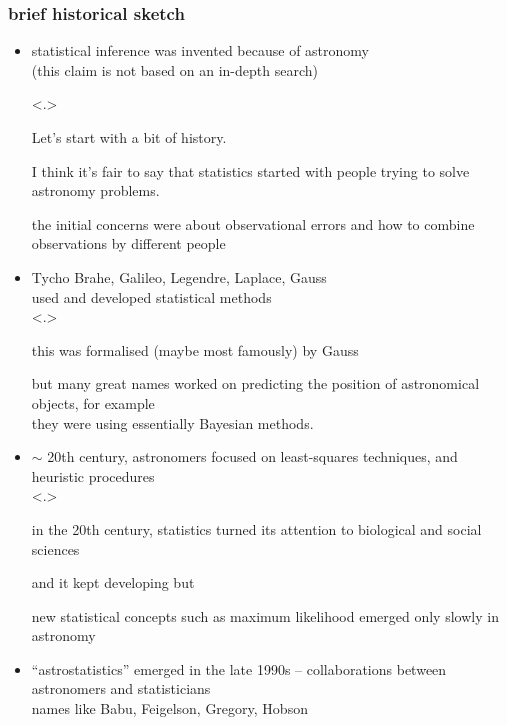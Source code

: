 \documentclass{beamer}              %
\begin{document}
\begin{frame}
  \frametitle{brief historical sketch}

  \begin{itemize}[<+->]
    \item statistical inference was invented because of astronomy\\
      {\footnotesize (this claim is not based on an in-depth search)}

    \note<.>{
            Let's start with a bit of history.

            I think it's fair to say that statistics started with people trying to solve astronomy problems.

            the initial concerns were about observational errors and how to combine observations by different people
            }

    \item Tycho Brahe, Galileo, Legendre, Laplace, Gauss \\used and developed statistical methods\\

    \note<.>{
            this was formalised (maybe most famously) by Gauss

            but many great names worked on predicting the position of astronomical objects, for example\\

            they were using essentially Bayesian methods.
            }

    
    \item $\sim$ 20th century, astronomers focused on least-squares techniques, and heuristic procedures\\

    \note<.>{
            in the 20th century, statistics turned its attention to biological and social sciences

            and it kept developing but

            new statistical concepts such as maximum likelihood emerged only slowly in astronomy
            }    

    
    \item ``astrostatistics'' emerged in the late 1990s -- collaborations between astronomers and statisticians\\
          {\footnotesize names like Babu, Feigelson, Gregory, Hobson}


\end{itemize}
\end{frame}
\end{document}
